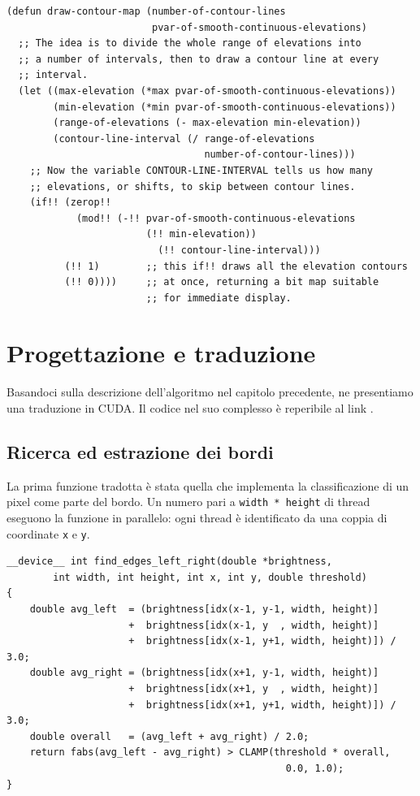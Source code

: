 \documentclass[12pt,a4paper,openright,twoside]{report}
\begin{document}
\begin{lstlisting}[style=mystyle]
(defun draw-contour-map (number-of-contour-lines
                         pvar-of-smooth-continuous-elevations)
  ;; The idea is to divide the whole range of elevations into
  ;; a number of intervals, then to draw a contour line at every
  ;; interval.
  (let ((max-elevation (*max pvar-of-smooth-continuous-elevations))
        (min-elevation (*min pvar-of-smooth-continuous-elevations))
        (range-of-elevations (- max-elevation min-elevation))
        (contour-line-interval (/ range-of-elevations
                                  number-of-contour-lines)))
    ;; Now the variable CONTOUR-LINE-INTERVAL tells us how many
    ;; elevations, or shifts, to skip between contour lines.
    (if!! (zerop!!
            (mod!! (-!! pvar-of-smooth-continuous-elevations
                        (!! min-elevation))
                          (!! contour-line-interval)))
          (!! 1)        ;; this if!! draws all the elevation contours
          (!! 0))))     ;; at once, returning a bit map suitable
                        ;; for immediate display.
\end{lstlisting}

\chapter{Progettazione e traduzione}

Basandoci sulla descrizione dell'algoritmo nel capitolo precedente, ne presentiamo una traduzione in CUDA. Il codice nel suo complesso è reperibile al link \cite{thecode}.

\section{Ricerca ed estrazione dei bordi}

La prima funzione tradotta è stata quella che implementa la classificazione di un pixel come parte del bordo. Un numero pari a \verb|width * height| di thread eseguono la funzione in parallelo: ogni thread è identificato da una coppia di coordinate \verb|x| e \verb|y|.

\begin{lstlisting}[style=mystyle]
__device__ int find_edges_left_right(double *brightness,
        int width, int height, int x, int y, double threshold)
{
    double avg_left  = (brightness[idx(x-1, y-1, width, height)]
                     +  brightness[idx(x-1, y  , width, height)]
                     +  brightness[idx(x-1, y+1, width, height)]) / 3.0;
    double avg_right = (brightness[idx(x+1, y-1, width, height)]
                     +  brightness[idx(x+1, y  , width, height)]
                     +  brightness[idx(x+1, y+1, width, height)]) / 3.0;
    double overall   = (avg_left + avg_right) / 2.0;
    return fabs(avg_left - avg_right) > CLAMP(threshold * overall,
                                                0.0, 1.0);
}
\end{lstlisting}
\end{document}
